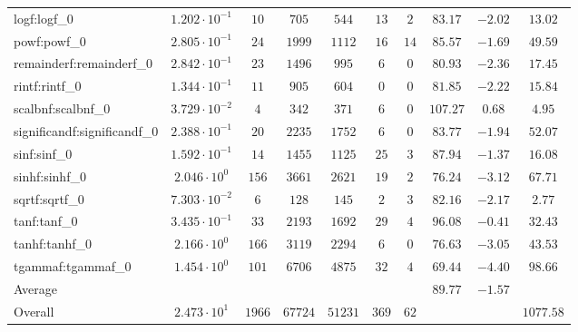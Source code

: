 \begin{tabular}{|l|c|c|c|c|c|c|c|c|c|}
logf:logf\_0                 & $ 1.202 \cdot 10^{-1} $ & $ 10     $ & $ 705   $ & $ 544   $ & $ 13  $ & $ 2  $ & $ 83.17       $ & $ -2.02   $ & $ 13.02   $ \\
powf:powf\_0                 & $ 2.805 \cdot 10^{-1} $ & $ 24     $ & $ 1999  $ & $ 1112  $ & $ 16  $ & $ 14 $ & $ 85.57       $ & $ -1.69   $ & $ 49.59   $ \\
remainderf:remainderf\_0     & $ 2.842 \cdot 10^{-1} $ & $ 23     $ & $ 1496  $ & $ 995   $ & $ 6   $ & $ 0  $ & $ 80.93       $ & $ -2.36   $ & $ 17.45   $ \\
rintf:rintf\_0               & $ 1.344 \cdot 10^{-1} $ & $ 11     $ & $ 905   $ & $ 604   $ & $ 0   $ & $ 0  $ & $ 81.85       $ & $ -2.22   $ & $ 15.84   $ \\
scalbnf:scalbnf\_0           & $ 3.729 \cdot 10^{-2} $ & $ 4      $ & $ 342   $ & $ 371   $ & $ 6   $ & $ 0  $ & $ 107.27      $ & $ 0.68    $ & $ 4.95    $ \\
significandf:significandf\_0 & $ 2.388 \cdot 10^{-1} $ & $ 20     $ & $ 2235  $ & $ 1752  $ & $ 6   $ & $ 0  $ & $ 83.77       $ & $ -1.94   $ & $ 52.07   $ \\
sinf:sinf\_0                 & $ 1.592 \cdot 10^{-1} $ & $ 14     $ & $ 1455  $ & $ 1125  $ & $ 25  $ & $ 3  $ & $ 87.94       $ & $ -1.37   $ & $ 16.08   $ \\
sinhf:sinhf\_0               & $ 2.046 \cdot 10^{0}  $ & $ 156    $ & $ 3661  $ & $ 2621  $ & $ 19  $ & $ 2  $ & $ 76.24       $ & $ -3.12   $ & $ 67.71   $ \\
sqrtf:sqrtf\_0               & $ 7.303 \cdot 10^{-2} $ & $ 6      $ & $ 128   $ & $ 145   $ & $ 2   $ & $ 3  $ & $ 82.16       $ & $ -2.17   $ & $ 2.77    $ \\
tanf:tanf\_0                 & $ 3.435 \cdot 10^{-1} $ & $ 33     $ & $ 2193  $ & $ 1692  $ & $ 29  $ & $ 4  $ & $ 96.08       $ & $ -0.41   $ & $ 32.43   $ \\
tanhf:tanhf\_0               & $ 2.166 \cdot 10^{0}  $ & $ 166    $ & $ 3119  $ & $ 2294  $ & $ 6   $ & $ 0  $ & $ 76.63       $ & $ -3.05   $ & $ 43.53   $ \\
tgammaf:tgammaf\_0           & $ 1.454 \cdot 10^{0}  $ & $ 101    $ & $ 6706  $ & $ 4875  $ & $ 32  $ & $ 4  $ & $ 69.44       $ & $ -4.40   $ & $ 98.66   $ \\
\hline
Average                      & $                     $ & $        $ & $       $ & $       $ & $     $ & $    $ & $ 89.77       $ & $ -1.57   $ & $         $ \\
\hline
Overall                      & $ 2.473 \cdot 10^{1}  $ & $ 1966   $ & $ 67724 $ & $ 51231 $ & $ 369 $ & $ 62 $ & $             $ & $         $ & $ 1077.58 $ \\
\hline
\end{tabular}

